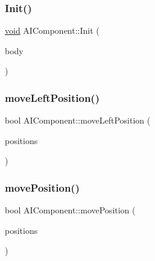 \mbox{\label{classAIComponent_a09ef4a12ea342b7e9cbb0f0e1aeceefe}} 
\subsubsection{\texorpdfstring{Init()}{Init()}}
{\footnotesize\ttfamily \hyperlink{imgui__impl__opengl3__loader_8h_ac668e7cffd9e2e9cfee428b9b2f34fa7}{void} A\+I\+Component\+::\+Init (\begin{DoxyParamCaption}\item[{b2\+Body $\ast$}]{body }\end{DoxyParamCaption})\hspace{0.3cm}{\ttfamily [inline]}}

\mbox{\label{classAIComponent_aa584e4cfba8281933bfff799c9caf06d}} 
\subsubsection{\texorpdfstring{move\+Left\+Position()}{moveLeftPosition()}}
{\footnotesize\ttfamily bool A\+I\+Component\+::move\+Left\+Position (\begin{DoxyParamCaption}\item[{b2\+Vec2}]{positions }\end{DoxyParamCaption})\hspace{0.3cm}{\ttfamily [inline]}}

\mbox{\label{classAIComponent_a24853885627e632ae760ae372bb57714}} 
\subsubsection{\texorpdfstring{move\+Position()}{movePosition()}}
{\footnotesize\ttfamily bool A\+I\+Component\+::move\+Position (\begin{DoxyParamCaption}\item[{b2\+Vec2}]{positions }\end{DoxyParamCaption})\hspace{0.3cm}{\ttfamily [inline]}}

